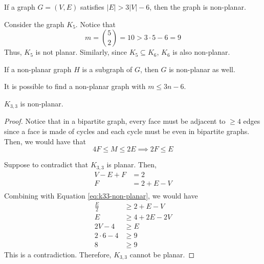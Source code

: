 \begin{corollary}
  If a graph \(G = (V, E)\) satisfies \(|E| > 3|V| - 6\), then 
  the graph is non-planar. 
\end{corollary}

\begin{nexample}
  Consider the graph \(K_5\). Notice that
  \[ m = \binom{5}{2} = 10 > 3\cdot5 - 6 = 9 \]
  Thus, \(K_5\) is not planar. Similarly, since \(K_5 \subseteq
  K_6\), \(K_6\) is also non-planar.
\end{nexample}

\begin{remark}
  If a non-planar graph \(H\) is a subgraph of \(G\), then \(G\)
  is non-planar as well.
\end{remark}

\begin{remark}
  It is possible to find a non-planar graph with \(m \leq 3n-6\).
\end{remark}

\begin{theorem}
  \(K_{3, 3}\) is non-planar.
\end{theorem}

\begin{proof}
  Notice that in a bipartite graph, every face must be adjacent
  to \(\geq 4\) edges since a face is made of cycles and each 
  cycle must be even in bipartite graphs. Then, we would have
  that
  \begin{equation}
    4F \leq M \leq 2E \implies 2F \leq E
    \label{eq:k33-non-planar}
  \end{equation}

  Suppose to contradict that \(K_{3, 3}\) is planar. Then,
  \[
    \begin{aligned}
      V - E + F &= 2 \\
      F &= 2 + E - V \\
    \end{aligned}
  \]
  Combining with Equation \ref{eq:k33-non-planar}, we would have
  \[
    \begin{aligned}
      \frac{E}{2} &\geq 2 + E - V \\
      E &\geq 4 + 2E - 2V \\
      2V - 4 &\geq E \\
      2 \cdot 6 - 4 &\geq 9 \\
      8 &\geq 9
    \end{aligned}
  \]
  This is a contradiction. Therefore, \(K_{3, 3}\) cannot be
  planar.
\end{proof}

